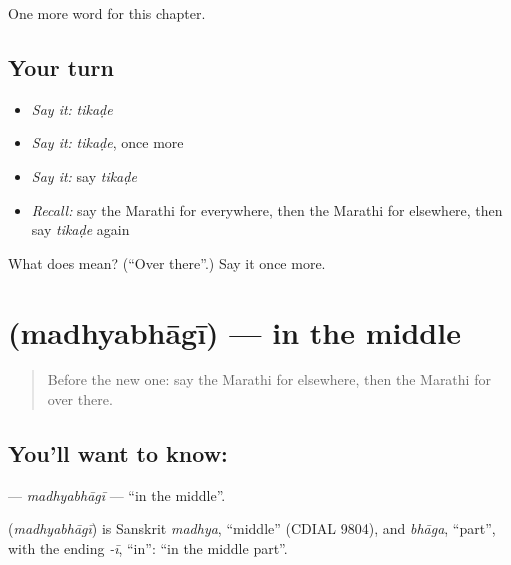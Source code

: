 \begin{grammarlens}[title={What you've built}]
One more word for this chapter.
\end{grammarlens}

\subsection*{Your turn}
\begin{itemize}
\raggedright
  \item \emph{Say it:} \emph{tikaḍe}
  \item \emph{Say it:} \emph{tikaḍe}, once more
  \item \emph{Say it:} say \emph{tikaḍe}
  \item \emph{Recall:} say the Marathi for everywhere, then the Marathi for elsewhere, then say \emph{tikaḍe} again
\end{itemize}

\begin{tcolorbox}[breakable,colback=teal!4,colframe=teal!35!black,title={Before you move on}]
What does  mean? (\textquotedblleft{}Over there\textquotedblright{}.) Say it once more.
\end{tcolorbox}
\section[\texorpdfstring{\mr{मध्यभागी} (madhyabhāgī)}{मध्यभागी (madhyabhāgī)}]{ (madhyabhāgī) — in the middle}

\label{lesson:MR-C172-madhyabhagi}



\begin{quote}
Before the new one: say the Marathi for elsewhere, then the Marathi for over there.
\end{quote}

\subsection*{You'll want to know: }
\textbf{} — \emph{madhyabhāgī} — \textquotedblleft{}in the middle\textquotedblright{}.

\begin{cousinweb}
\textbf{} (\emph{madhyabhāgī}) is Sanskrit \emph{madhya}, \textquotedblleft{}middle\textquotedblright{} (CDIAL 9804), and \emph{bhāga}, \textquotedblleft{}part\textquotedblright{}, with the ending \emph{-ī}, \textquotedblleft{}in\textquotedblright{}: \textquotedblleft{}in the middle part\textquotedblright{}.
\end{cousinweb}

